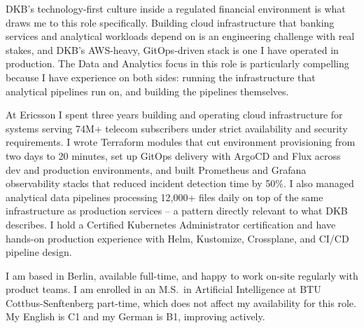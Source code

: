 \documentclass[11pt, a4paper]{awesome-cv}
\begin{document}
\makecvheader[R]
\makelettertitle

\begin{cvletter}

DKB's technology-first culture inside a regulated financial environment is what draws me to this role specifically. Building cloud infrastructure that banking services and analytical workloads depend on is an engineering challenge with real stakes, and DKB's AWS-heavy, GitOps-driven stack is one I have operated in production. The Data and Analytics focus in this role is particularly compelling because I have experience on both sides: running the infrastructure that analytical pipelines run on, and building the pipelines themselves.

At Ericsson I spent three years building and operating cloud infrastructure for systems serving 74M+ telecom subscribers under strict availability and security requirements. I wrote Terraform modules that cut environment provisioning from two days to 20 minutes, set up GitOps delivery with ArgoCD and Flux across dev and production environments, and built Prometheus and Grafana observability stacks that reduced incident detection time by 50\%. I also managed analytical data pipelines processing 12,000+ files daily on top of the same infrastructure as production services -- a pattern directly relevant to what DKB describes. I hold a Certified Kubernetes Administrator certification and have hands-on production experience with Helm, Kustomize, Crossplane, and CI/CD pipeline design.

I am based in Berlin, available full-time, and happy to work on-site regularly with product teams. I am enrolled in an M.S.\ in Artificial Intelligence at BTU Cottbus-Senftenberg part-time, which does not affect my availability for this role. My English is C1 and my German is B1, improving actively.

\end{cvletter}

\makeletterclosing
\end{document}
